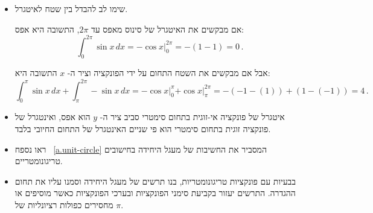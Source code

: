 \begin{itemize}
\np

\item 
שימו לב להבדל בין שטח לאיטגרל.

\begin{center}
\end{center}

אם מבקשים את האיטגרל של סינוס מאפס עד 
$2\pi$,
התשובה היא אפס:
\[
\int_0^{2\pi} \sin x\, dx =-\left.\cos x\right|_0^{2\pi}= -(1-1)=0\,.
\]

\vspace{-4ex}

אבל אם מבקשים את השטח התחום על ידי הפונקציה וציר ה-%
$x$
התשובה היא:
\[
\int_0^{\pi} \sin x\, dx + \int_{\pi}^{2\pi} -\sin x\, dx = -\left.\cos x\right|_0^{\pi} \left.+\cos x\right|_{\pi}^{2\pi}= -(-1-(1))+(1-(-1))=4\,.
\]

\vspace{-4ex}


\item
איטגרל של פונקציה אי-זוגית בתחום סימטרי סביב ציר ה-%
$y$
הוא אפס, ואינטגרל של פונקציה זוגית בתחום סימטרי הוא פי שניים האינטגרל של התחום החיובי בלבד.


\item
ראו נספח~%
\ref{a.unit-circle}
המסביר את החשיבות של מעגל היחידה בחישובים טריגונומטריים.


\item
בבעיות עם פונקציות טריגונומטריות, בנו תרשים של מעגל היחידה וסמנו עליו את תחום ההגדרה. התרשים יעזור בקביעת סימני הפונקציות ובערכי הפונקציות כאשר מוסיפים או מחסירים כפולות רציונליות של 
$\pi$.


\end{itemize}
